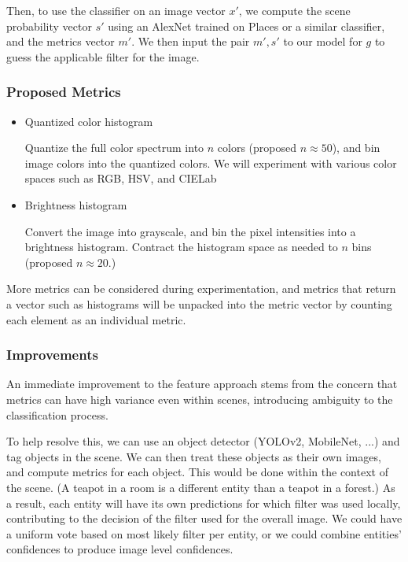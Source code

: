 \documentclass[a4paper, 11pt]{article}
\begin{document}
Then, to use the classifier on an image vector $x'$, we compute the scene probability vector $s'$ using an AlexNet trained on Places \cite{Places} or a similar classifier, and the metrics vector $m'$. We then input the pair $m', s'$ to our model for $g$ to guess the applicable filter for the image.

\subsubsection*{Proposed Metrics}

\begin{itemize}
    \item Quantized color histogram
    
    Quantize the full color spectrum into $n$ colors (proposed $n \approx 50$), and bin image colors into the quantized colors. We will experiment with various color spaces such as RGB, HSV, and CIELab
    
    \item Brightness histogram
    
    Convert the image into grayscale, and bin the pixel intensities into a brightness histogram. Contract the histogram space as needed to $n$ bins (proposed $n \approx 20$.)
\end{itemize}

More metrics can be considered during experimentation, and metrics that return a vector such as histograms will be unpacked into the metric vector by counting each element as an individual metric.


\subsubsection*{Improvements}
An immediate improvement to the feature approach stems from the concern that metrics can have high variance even within scenes, introducing ambiguity to the classification process. 

To help resolve this, we can use an object detector (YOLOv2, MobileNet, ...) and tag objects in the scene. We can then treat these objects as their own images, and compute metrics for each object. This would be done within the context of the scene. (A teapot in a room is a different entity than a teapot in a forest.) As a result, each entity will have its own predictions for which filter was used locally, contributing to the decision of the filter used for the overall image. We could have a uniform vote based on most likely filter per entity, or we could combine entities' confidences to produce image level confidences.
\end{document}
